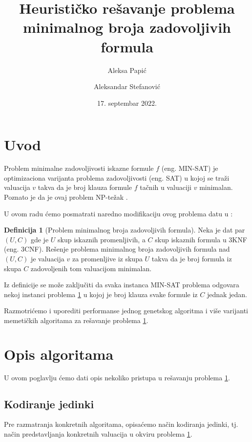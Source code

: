 \documentclass[12pt, a4paper]{article}
\title{Heurističko rešavanje problema minimalnog broja zadovoljivih formula}
\author{
	Aleksa Papić
	\and
	Aleksandar Stefanović
}
\date{17. septembar 2022.}
\theoremstyle{definition}
\newtheorem{definition}{Definicija}[section]
\begin{document}
\maketitle

\tableofcontents

\newpage

\section{Uvod}

Problem minimalne zadovoljivosti iskazne formule $f$ (eng. MIN-SAT) je optimizaciona varijanta problema zadovoljivosti (eng. SAT) u kojoj se traži valuacija $v$ takva da je broj klauza formule $f$ tačnih u valuaciji $v$ minimalan. Poznato je da je ovaj problem NP-težak \cite{1}.

U ovom radu ćemo posmatrati naredno modifikaciju ovog problema datu u \cite{2}:
\begin{definition}[Problem minimalnog broja zadovoljivih formula]
\label{def 1.1}
Neka je dat par $(U, C)$ gde je $U$ skup iskaznih promenljivih, a $C$ skup iskaznih formula u 3KNF (eng. 3CNF). Rešenje problema minimalnog broja zadovoljivih formula nad $(U, C)$ je valuacija $v$ za promenljive iz skupa $U$ takva da je broj formula iz skupa $C$ zadovoljenih tom valuacijom minimalan.
\end{definition}

Iz definicije se može zaključiti da svaka instanca MIN-SAT problema odgovara nekoj instanci problema \ref{def 1.1} u kojoj je broj klauza svake formule iz $C$ jednak jedan.

Razmotrićemo i uporediti performanse jednog genetskog algoritma i više varijanti memetičkih algoritama za rešavanje problema \ref{def 1.1}.

\section{Opis algoritama}

U ovom poglavlju ćemo dati opis nekoliko pristupa u rešavanju problema \ref{def 1.1}.

\subsection{Kodiranje jedinki}

Pre razmatranja konkretnih algoritama, opisaćemo način kodiranja jedinki, tj. način predstavljanja konkretnih valuacija u okviru problema \ref{def 1.1}.
\end{document}
